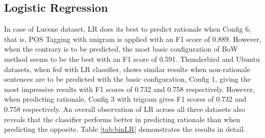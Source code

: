 \documentclass[a4paper,12pt,twoside]{report}
\begin{document}
\subsection{Logistic Regression}
In case of Lucene dataset, LR does its best to predict rationale when Config 6, that is, POS Tagging with unigram is applied with an F1 score of 0.889. However, when the contrary is to be predicted, the most basic configuration of BoW method seems to be the best with an F1 score of 0.591. Thunderbird and Ubuntu datasets, when fed with LR classifier, shows similar results when non-rationale sentences are to be predicted with the basic configuration, Config 1, giving the most impressive results with F1 scores of 0.732 and 0.758 respectively. However, when predicting rationale, Config 3 with trigram gives F1 scores of 0.732 and 0.758 respectively. An overall observation of LR across all three datasets also reveals that the classifier performs better in predicting rationale than when predicting the opposite. Table \ref{tab:binLR} demonstrates the results in detail. 
\end{document}
